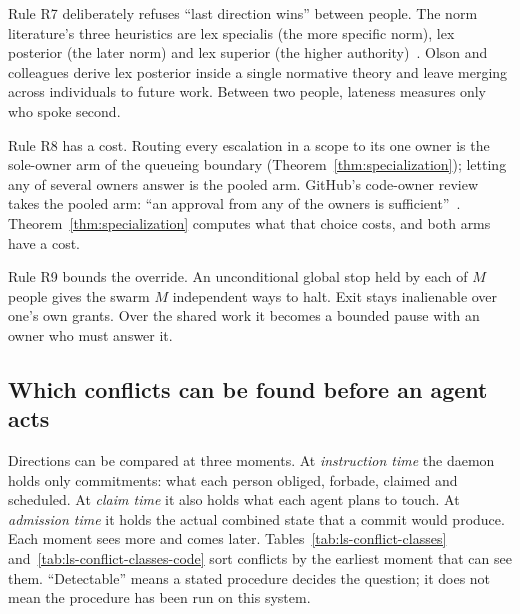 Rule R7 deliberately refuses ``last direction wins'' between people. The norm
literature's three heuristics are lex specialis (the more specific norm), lex
posterior (the later norm) and lex superior (the higher
authority)~. Olson and colleagues derive lex
posterior inside a single normative theory and leave merging across
individuals to future work. Between two people, lateness measures only who
spoke second.

Rule R8 has a cost. Routing every escalation in a scope to its one owner is
the sole-owner arm of the queueing boundary (Theorem~\ref{thm:specialization});
letting any of several owners answer is the pooled arm. GitHub's code-owner
review takes the pooled arm: ``an approval from any of the owners is
sufficient''~. Theorem~\ref{thm:specialization} computes
what that choice costs, and both arms have a cost.

Rule R9 bounds the override. An unconditional global stop held by each of $M$
people gives the swarm $M$ independent ways to halt. Exit stays inalienable
over one's own grants. Over the shared work it becomes a bounded pause with an
owner who must answer it.

\subsection{Which conflicts can be found before an agent acts}\label{sec:ls-many-authors-conflicts}

Directions can be compared at three moments. At \emph{instruction time} the
daemon holds only commitments: what each person obliged, forbade, claimed and
scheduled. At \emph{claim time} it also holds what each agent plans to touch.
At \emph{admission time} it holds the actual combined state that a commit would
produce. Each moment sees more and comes later.
Tables~\ref{tab:ls-conflict-classes} and~\ref{tab:ls-conflict-classes-code}
sort conflicts by the earliest moment that can see them. ``Detectable'' means a stated procedure decides the question; it
does not mean the procedure has been run on this system.

